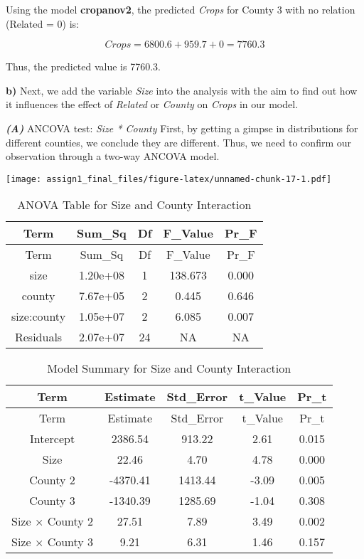 \documentclass[
]{article}
\begin{document}
Using the model \textbf{cropanov2}, the predicted \emph{Crops} for
County 3 with no relation (Related = 0) is:

\[
Crops = 6800.6 + 959.7 + 0 = 7760.3
\]

Thus, the predicted value is 7760.3.

\textbf{b)} Next, we add the variable \emph{Size} into the analysis with
the aim to find out how it influences the effect of \emph{Related} or
\emph{County} on \emph{Crops} in our model.

\textbf{\emph{(A)}} ANCOVA test: \emph{Size * County} First, by getting
a gimpse in distributions for different counties, we conclude they are
different. Thus, we need to confirm our observation through a two-way
ANCOVA model.

\texttt{[image: assign1\_final\_files/figure-latex/unnamed-chunk-17-1.pdf]}

\begin{longtable}[]{@{}ccccc@{}}
\caption{ANOVA Table for Size and County Interaction}\tabularnewline
\toprule\noalign{}
Term & Sum\_Sq & Df & F\_Value & Pr\_F \\
\midrule\noalign{}
\endfirsthead
\toprule\noalign{}
Term & Sum\_Sq & Df & F\_Value & Pr\_F \\
\midrule\noalign{}
\endhead
\bottomrule\noalign{}
\endlastfoot
size & 1.20e+08 & 1 & 138.673 & 0.000 \\
county & 7.67e+05 & 2 & 0.445 & 0.646 \\
size:county & 1.05e+07 & 2 & 6.085 & 0.007 \\
Residuals & 2.07e+07 & 24 & NA & NA \\
\end{longtable}

\begin{longtable}[]{@{}ccccc@{}}
\caption{Model Summary for Size and County Interaction}\tabularnewline
\toprule\noalign{}
Term & Estimate & Std\_Error & t\_Value & Pr\_t \\
\midrule\noalign{}
\endfirsthead
\toprule\noalign{}
Term & Estimate & Std\_Error & t\_Value & Pr\_t \\
\midrule\noalign{}
\endhead
\bottomrule\noalign{}
\endlastfoot
Intercept & 2386.54 & 913.22 & 2.61 & 0.015 \\
Size & 22.46 & 4.70 & 4.78 & 0.000 \\
County 2 & -4370.41 & 1413.44 & -3.09 & 0.005 \\
County 3 & -1340.39 & 1285.69 & -1.04 & 0.308 \\
Size × County 2 & 27.51 & 7.89 & 3.49 & 0.002 \\
Size × County 3 & 9.21 & 6.31 & 1.46 & 0.157 \\
\end{longtable}
\end{document}
